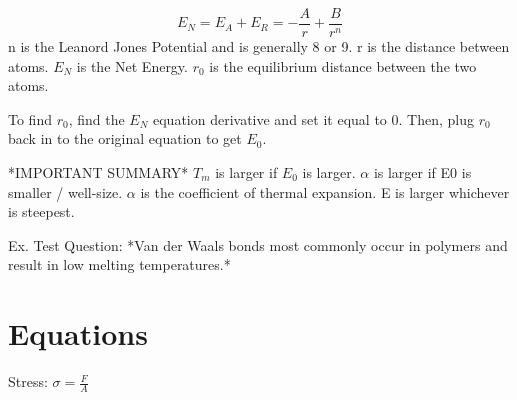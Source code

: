 \documentclass[12pt]{article}
\begin{document}
\[ E_N = E_A + E_R = - \frac{A}{r} + \frac{B}{r^n}\]
n is the Leanord Jones Potential and is generally 8 or 9.
r is the distance between atoms.
$E_N$ is the Net Energy.
$r_0$ is the equilibrium distance between the two atoms.

To find $r_0$, find the $E_N$ equation derivative and set it equal to 0. Then, plug $r_0$ back in to the original equation to get $E_0$.

*IMPORTANT SUMMARY*
$T_m$ is larger if $E_0$ is larger.
$\alpha$ is larger if E0 is smaller / well-size.
$\alpha$ is the coefficient of thermal expansion.
E is larger whichever is steepest.

Ex. Test Question: *Van der Waals bonds most commonly occur in polymers and result in low melting temperatures.*

\section{Equations}
Stress: $\sigma = \frac{F}{A}$
\end{document}
